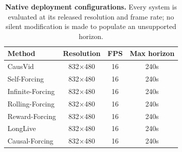 \begin{table}[t]
\centering
\scriptsize
\setlength{\tabcolsep}{4pt}
\begin{tabular}{l c c c}
\toprule
Method & Resolution & FPS & Max horizon \\
\midrule
CausVid & 832$\times$480 & 16 & 240s \\
Self-Forcing & 832$\times$480 & 16 & 240s \\
Infinite-Forcing & 832$\times$480 & 16 & 240s \\
Rolling-Forcing & 832$\times$480 & 16 & 240s \\
Reward-Forcing & 832$\times$480 & 16 & 240s \\
LongLive & 832$\times$480 & 16 & 240s \\
Causal-Forcing & 832$\times$480 & 16 & 240s \\
\bottomrule
\end{tabular}
\caption{\textbf{Native deployment configurations.} Every system is evaluated at its released resolution and frame rate; no silent modification is made to populate an unsupported horizon.}
\label{tab:native_configs}
\end{table}